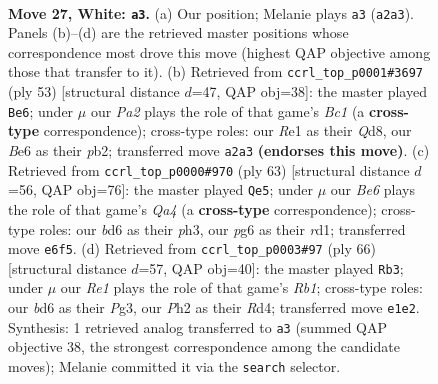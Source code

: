 \documentclass[11pt]{article}
\begin{document}
\clearpage

\begin{figure}[p]\centering
\begin{subfigure}{0.46\textwidth}\centering
\resizebox{\linewidth}{!}{%
\newchessgame
\chessboard[
  setfen={8/pp5p/3bB1pk/8/8/5qP1/PP3P1P/4R1K1 w - - 3 27},
  showmover=false,
  pgfstyle=straightmove, color=movearrow, markmove={a2-a3}
]}
\caption{}
\end{subfigure}\hfill
\begin{subfigure}{0.46\textwidth}\centering
\resizebox{\linewidth}{!}{%
\newchessgame
\chessboard[
  setfen={2bq2k1/5pp1/2p4p/4Q2P/3p4/3B4/1P3PP1/6K1 b - - 0 27},
  showmover=false,
  pgfstyle=straightmove, color=movearrow, markmove={c8-e6}
]}
\caption{}
\end{subfigure}
\\[4pt]
\begin{subfigure}{0.46\textwidth}\centering
\resizebox{\linewidth}{!}{%
\newchessgame
\chessboard[
  setfen={4r1k1/p4p2/5Q1p/q5p1/8/6PP/5PK1/3R4 b - - 5 32},
  showmover=false,
  pgfstyle=straightmove, color=movearrow, markmove={a5-e5}
]}
\caption{}
\end{subfigure}\hfill
\begin{subfigure}{0.46\textwidth}\centering
\resizebox{\linewidth}{!}{%
\newchessgame
\chessboard[
  setfen={6k1/1p3p2/1p6/7p/3RP1p1/6P1/4qP1P/1R4K1 w - - 0 34},
  showmover=false,
  pgfstyle=straightmove, color=movearrow, markmove={b1-b3}
]}
\caption{}
\end{subfigure}
\caption{\textbf{Move 27, White: \texttt{a3}.} (a) Our position; Melanie plays \texttt{a3} (\texttt{a2a3}). Panels (b)--(d) are the retrieved master positions whose correspondence most drove this move (highest QAP objective among those that transfer to it). (b) Retrieved from \texttt{ccrl\_top\_p0001\#3697} (ply 53) [structural distance $d$=47, QAP obj=38]: the master played \texttt{Be6}; under $\mu$ our \emph{Pa2} plays the role of that game's \emph{Bc1} (a \textbf{cross-type} correspondence); cross-type roles: our \emph{R}e1 as their \emph{Q}d8, our \emph{B}e6 as their \emph{p}b2; transferred move \texttt{a2a3} \textbf{(endorses this move)}. (c) Retrieved from \texttt{ccrl\_top\_p0000\#970} (ply 63) [structural distance $d$=56, QAP obj=76]: the master played \texttt{Qe5}; under $\mu$ our \emph{Be6} plays the role of that game's \emph{Qa4} (a \textbf{cross-type} correspondence); cross-type roles: our \emph{b}d6 as their \emph{p}h3, our \emph{p}g6 as their \emph{r}d1; transferred move \texttt{e6f5}. (d) Retrieved from \texttt{ccrl\_top\_p0003\#97} (ply 66) [structural distance $d$=57, QAP obj=40]: the master played \texttt{Rb3}; under $\mu$ our \emph{Re1} plays the role of that game's \emph{Rb1}; cross-type roles: our \emph{b}d6 as their \emph{P}g3, our \emph{P}h2 as their \emph{R}d4; transferred move \texttt{e1e2}. Synthesis: 1 retrieved analog transferred to \texttt{a3} (summed QAP objective 38, the strongest correspondence among the candidate moves); Melanie committed it via the \texttt{search} selector.}
\label{fig:thought-m52}
\end{figure}
\end{document}
